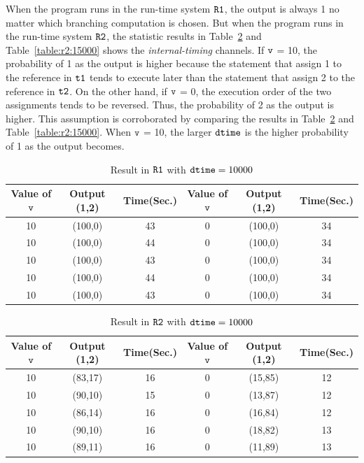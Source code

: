 \documentclass[a4paper]{report}
\newcommand{\co}[1]{$\cod{#1}$}
\begin{document}
When the program runs in the run-time system \co{R1}, the output is always 1 no matter which branching computation 
is chosen. But when the program runs in the run-time system \co{R2}, the statistic results in 
Table~\ref{table:r2:10000} and Table~\ref{table:r2:15000} shows the {\em internal-timing} channels.
If \co{v} = 10, the probability of 1 as the output
is higher because the statement that assign 1 to the reference in \co{t1} tends to execute 
later than the statement that assign 2 to the reference in \co{t2}. On the other hand, if 
\co{v} = 0, the execution order of the two assignments tends to be reversed. Thus, the probability of 2
as the output is higher. This assumption is corroborated by comparing the results in Table~\ref{table:r2:10000}
and Table~\ref{table:r2:15000}. When \co{v} = 10, the larger \co{dtime} is the higher probability
of 1 as the output becomes.

\begin{table}[t]
\centering
\begin{tabular}{|ccc||ccc|}
\hline
{\bf Value of} \co{v}& {\bf Output} (1,2)& {\bf Time}({\bf Sec.}) & 
{\bf Value of} \co{v}& {\bf Output} (1,2)& {\bf Time}({\bf Sec.})\\ \hline
10 & (100,0) & 43  & 0 & (100,0) & 34 \\
10 & (100,0) & 44  & 0 & (100,0) & 34 \\
10 & (100,0) & 43  & 0 & (100,0) & 34 \\
10 & (100,0) & 44  & 0 & (100,0) & 34 \\
10 & (100,0) & 43  & 0 & (100,0) & 34 \\
\hline
\end{tabular}
\caption{Result in \co{R1} with $\mathtt{dtime} = 10000$}
\label{table:r1:10000}
\end{table}

\begin{table}[t]
\centering
\begin{tabular}{|ccc||ccc|}
\hline
{\bf Value of} \co{v}& {\bf Output} (1,2)& {\bf Time}({\bf Sec.}) & 
{\bf Value of} \co{v}& {\bf Output} (1,2)& {\bf Time}({\bf Sec.})\\ \hline
10 & (83,17) & 16  & 0 & (15,85) & 12 \\
10 & (90,10) & 15  & 0 & (13,87) & 12 \\
10 & (86,14) & 16  & 0 & (16,84) & 12 \\
10 & (90,10) & 16  & 0 & (18,82) & 13 \\
10 & (89,11) & 16  & 0 & (11,89) & 13 \\
\hline
\end{tabular}
\caption{Result in \co{R2} with $\mathtt{dtime} = 10000$}
\label{table:r2:10000}
\end{table}
\end{document}
